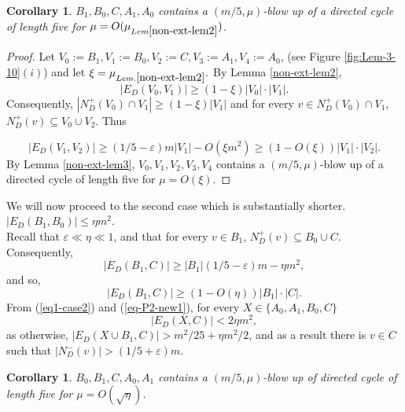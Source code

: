 \documentclass{article}
\newtheorem{cor}[theorem]{Corollary}
\renewcommand{\epsilon}{{\varepsilon}}
\begin{document}
 \begin{cor}\label{non-ext-cor1}
 $B_1,B_0,C, A_1, A_0$ contains a $(m/5,\mu)$-blow up of a directed cycle of length five for $\mu=O(\mu_{Lem \ref{non-ext-lem2}})$.
 \end{cor}
 \begin{proof}
Let $V_0:=B_1, V_1:=B_0, V_2:=C, V_3:=A_1, V_4:=A_0$, (see Figure \ref{fig:Lem-3-10}$(i)$)
 and let $\xi = \mu_{Lem. \ref{non-ext-lem2}}.$ By Lemma \ref{non-ext-lem2}, \begin{equation}\label{eq1-lem3}|E_D(V_0, V_1)|\geq (1-\xi)|V_0|\cdot |V_1|.
\end{equation}
Consequently, $|N^+_D(V_0)\cap V_1|\geq (1-\xi)|V_1|$ and for every $v\in N^+_D(V_0)\cap V_1$, $N^+_D(v)\subseteq V_0\cup V_2$. Thus

\begin{equation}\label{eq2-lem3}|E_D(V_1, V_2)|\geq (1/5-\epsilon)m |V_1|- O(\xi m^2)\geq (1-O(\xi))|V_1|\cdot |V_2|.\end{equation}
By Lemma \ref{non-ext-lem3}, $V_0, V_1, V_2, V_3, V_4$ contains a $(m/5, \mu)$-blow up of a directed cycle of length five for $\mu=O(\xi).$
 \end{proof}
We will now proceed to the second case which is substantially shorter.\\
  $|E_D(B_1, B_0)|\leq \eta m^2.$\\
Recall that $\epsilon \ll \eta \ll 1$, and that for every $v
 \in B_1$, $N^+_D(v)\subseteq B_0\cup C$. Consequently,
 \begin{equation}\label{eq1-case2}
 |E_D(B_1, C)|\geq |B_1|(1/5-\epsilon)m- \eta m^2,
 \end{equation}
 and so, 
\begin{equation}\label{eq1-case2.1}|E_D(B_1, C)|\geq (1-O(\eta))|B_1|\cdot |C|.\end{equation}
 From (\ref{eq1-case2}) and (\ref{eq-P2-new1}), for every $X\in \{A_0,A_1, B_0, C\}$
 \begin{equation}\label{eq2-case2}
 |E_D(X, C)|<2\eta m^2,
 \end{equation}
 as otherwise, $|E_D(X\cup B_1, C)|>m^2/25+\eta m^2/2$, and as a result
 there is $v\in C$ such that $|N^-_D(v)|>(1/5+\epsilon)m.$
 \begin{cor}\label{non-ext-cor2}
 $B_0, B_1,C, A_0, A_1$ contains a $(m/5,\mu)$-blow up of directed cycle of length five for $\mu=O(\sqrt{\eta})$.
 \end{cor}
\end{document}

